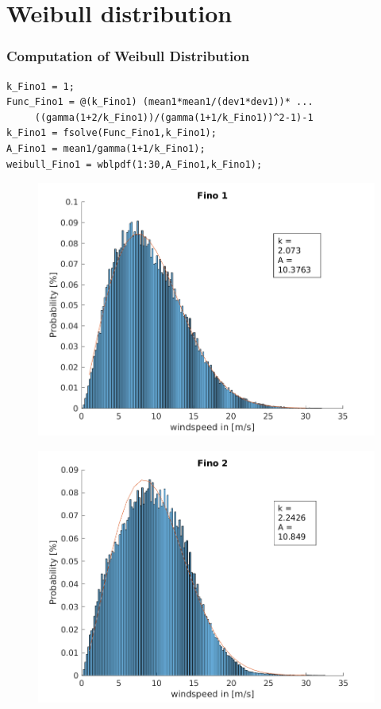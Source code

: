 \documentclass[12pt,t]{beamer}
\begin{document}
\section{Weibull distribution}

\begin{frame}[fragile]
\frametitle{Computation of Weibull Distribution}
\begin{lstlisting}
k_Fino1 = 1;
Func_Fino1 = @(k_Fino1) (mean1*mean1/(dev1*dev1))* ...
     ((gamma(1+2/k_Fino1))/(gamma(1+1/k_Fino1))^2-1)-1 
k_Fino1 = fsolve(Func_Fino1,k_Fino1);
A_Fino1 = mean1/gamma(1+1/k_Fino1);
weibull_Fino1 = wblpdf(1:30,A_Fino1,k_Fino1);
\end{lstlisting}
\begin{figure}[htbp]
	\begin{center}
		\begin{minipage}[t]{0.49\linewidth}
			\centering
		  \includegraphics[width=1\linewidth]{../../figures/Hist_withfit_Fino1.png}
			\label{histo1}
		\end{minipage}
		\begin{minipage}[t]{0.49\linewidth}
		  \centering
		  \includegraphics[width=1\linewidth]{../../figures/Hist_withfit_Fino2.png}
			\label{histo2}
		\end{minipage}
	\end{center}
\end{figure}
\end{frame}
\end{document}

